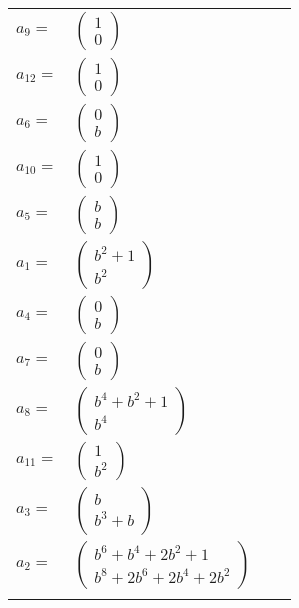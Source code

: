 \documentclass[1p]{elsarticle_modified}
\theoremstyle{definition}
\begin{document}
\begin{tabular}{m{7pt} m{180pt} m{7pt} m{180pt} }
\flushright $a_{9}=$&$\begin{pmatrix}1\\0\end{pmatrix}$ \\
\flushright $a_{12}=$&$\begin{pmatrix}1\\0\end{pmatrix}$ \\
\flushright $a_{6}=$&$\begin{pmatrix}0\\b\end{pmatrix}$ \\
\flushright $a_{10}=$&$\begin{pmatrix}1\\0\end{pmatrix}$ \\
\flushright $a_{5}=$&$\begin{pmatrix}b\\b\end{pmatrix}$ \\
\flushright $a_{1}=$&$\begin{pmatrix}b^2+1\\b^2\end{pmatrix}$ \\
\flushright $a_{4}=$&$\begin{pmatrix}0\\b\end{pmatrix}$ \\
\flushright $a_{7}=$&$\begin{pmatrix}0\\b\end{pmatrix}$ \\
\flushright $a_{8}=$&$\begin{pmatrix}b^4+b^2+1\\b^4\end{pmatrix}$ \\
\flushright $a_{11}=$&$\begin{pmatrix}1\\b^2\end{pmatrix}$ \\
\flushright $a_{3}=$&$\begin{pmatrix}b\\b^3+b\end{pmatrix}$ \\
\flushright $a_{2}=$&$\begin{pmatrix}b^6+b^4+2 b^2+1\\b^8+2 b^6+2 b^4+2 b^2\end{pmatrix}$\\&\end{tabular}
\end{document}
